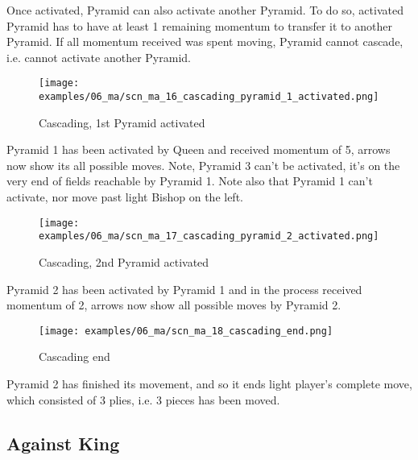 Once activated, Pyramid can also activate another Pyramid. To do so, activated
Pyramid has to have at least 1 remaining momentum to transfer it to another
Pyramid. If all momentum received was spent moving, Pyramid cannot cascade, i.e.
cannot activate another Pyramid.

\clearpage %

\noindent
\begin{figure}[!h]
\texttt{[image: examples/06\_ma/scn\_ma\_16\_cascading\_pyramid\_1\_activated.png]}
\caption{Cascading, 1st Pyramid activated}
\label{fig:scn_ma_16_cascading_pyramid_1_activated}
\end{figure}

Pyramid 1 has been activated by Queen and received momentum of 5, arrows now show
its all possible moves. Note, Pyramid 3 can't be activated, it's on the very end
of fields reachable by Pyramid 1. Note also that Pyramid 1 can't activate, nor move
past light Bishop on the left.

\clearpage %

\noindent
\begin{figure}[!h]
\texttt{[image: examples/06\_ma/scn\_ma\_17\_cascading\_pyramid\_2\_activated.png]}
\caption{Cascading, 2nd Pyramid activated}
\label{fig:scn_ma_17_cascading_pyramid_2_activated}
\end{figure}

Pyramid 2 has been activated by Pyramid 1 and in the process received momentum of 2,
arrows now show all possible moves by Pyramid 2.

\clearpage %

\noindent
\begin{figure}[!h]
\texttt{[image: examples/06\_ma/scn\_ma\_18\_cascading\_end.png]}
\caption{Cascading end}
\label{fig:scn_ma_18_cascading_end}
\end{figure}

Pyramid 2 has finished its movement, and so it ends light player's complete move,
which consisted of 3 plies, i.e. 3 pieces has been moved.

\clearpage %

\subsection*{Against King}

